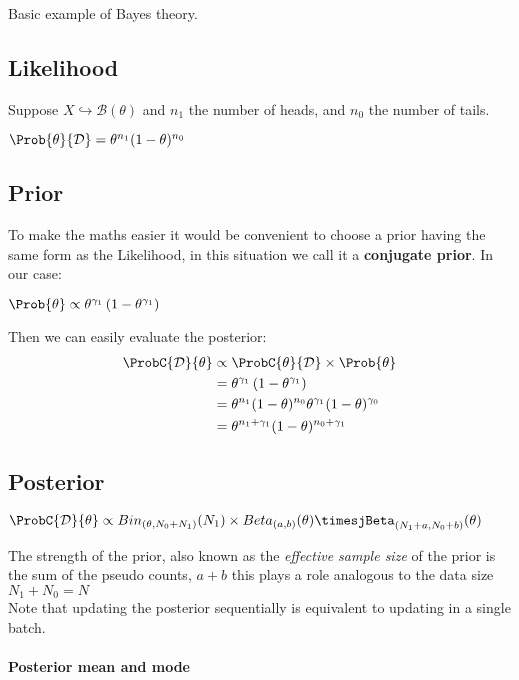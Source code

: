 Basic example of Bayes theory.

\subsection{Likelihood}
Suppose $ X \hookrightarrow \mathcal{B}(\theta)$ and $n_{1}$ the number of heads, and 
$n_{0}$ the number of tails.
\begin{center}
    $\Prob{\theta}{\mathcal{D}} = \theta^{n_{1}} (1-\theta)^{n_{0}}$
\end{center}

\subsection{Prior}
To make the maths easier it would be convenient to choose a prior having the same form as
the Likelihood, in this situation we call it a \textbf{conjugate prior}. In our case:
\begin{center}
    $\Prob{\theta} \propto \theta^{\gamma_{1}} \left(1-\theta^{\gamma_{1}}\right)$
\end{center}
Then we can easily evaluate the posterior:
\begin{align*}
    \ProbC{\mathcal{D}}{\theta}
    &\propto \ProbC{\theta}{\mathcal{D}} \times \Prob{\theta}\\
    &= \theta^{\gamma_{1}} \left(1-\theta^{\gamma_{1}}\right)\\ 
    &= \theta^{n_{1}} (1-\theta)^{n_{0}} \theta^{\gamma_{1}} (1-\theta)^{\gamma_{0}}\\ 
    &=\theta^{n_{1}+\gamma_{1}} (1-\theta)^{n_{0}+\gamma_{1}}
\end{align*}

\subsection{Posterior}
\begin{center}
    $\ProbC{\mathcal{D}}{\theta} \propto Bin_{(\theta, N_{0} + N_{1})}(N_{1}) 
    \times Beta_{(a,b)}(\theta) \timesjBeta_{(N_{1}+a, N_{0}+b)}(\theta)$
\end{center}

The strength of the prior, also known as the \emph{effective sample size} of the prior
is the sum of the pseudo counts, $a+b$ this plays a role analogous to the data size 
$N_{1} + N_{0} = N$\\
Note that updating the posterior sequentially is equivalent to updating in a single batch.
\paragraph{Posterior mean and mode}
